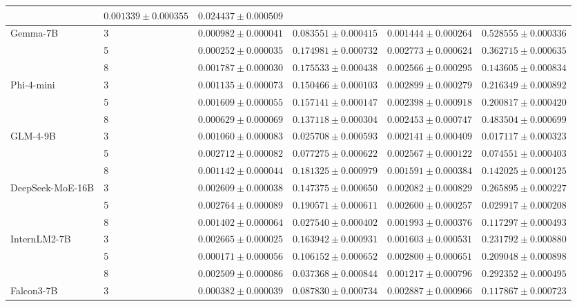 \begin{table}[!htbp]
\begin{tabular}{p{1.5cm} p{0.75cm} p{2.00cm} p{2.00cm} p{2.00cm} p{2.00cm}}
& $0.001339 \pm 0.000355$
& $0.024437 \pm 0.000509$ \\
\midrule
Gemma-7B
& 3
& $0.000982 \pm 0.000041$
& $0.083551 \pm 0.000415$
& $0.001444 \pm 0.000264$
& $0.528555 \pm 0.000336$ \\
& 5
& $0.000252 \pm 0.000035$
& $0.174981 \pm 0.000732$
& $0.002773 \pm 0.000624$
& $0.362715 \pm 0.000635$ \\
& 8
& $0.001787 \pm 0.000030$
& $0.175533 \pm 0.000438$
& $0.002566 \pm 0.000295$
& $0.143605 \pm 0.000834$ \\
\midrule
Phi-4-mini
& 3
& $0.001135 \pm 0.000073$
& $0.150466 \pm 0.000103$
& $0.002899 \pm 0.000279$
& $0.216349 \pm 0.000892$ \\
& 5
& $0.001609 \pm 0.000055$
& $0.157141 \pm 0.000147$
& $0.002398 \pm 0.000918$
& $0.200817 \pm 0.000420$ \\
& 8
& $0.000629 \pm 0.000069$
& $0.137118 \pm 0.000304$
& $0.002453 \pm 0.000747$
& $0.483504 \pm 0.000699$ \\
\midrule
GLM-4-9B
& 3
& $0.001060 \pm 0.000083$
& $0.025708 \pm 0.000593$
& $0.002141 \pm 0.000409$
& $0.017117 \pm 0.000323$ \\
& 5
& $0.002712 \pm 0.000082$
& $0.077275 \pm 0.000622$
& $0.002567 \pm 0.000122$
& $0.074551 \pm 0.000403$ \\
& 8
& $0.001142 \pm 0.000044$
& $0.181325 \pm 0.000979$
& $0.001591 \pm 0.000384$
& $0.142025 \pm 0.000125$ \\
\midrule
DeepSeek-MoE-16B
& 3
& $0.002609 \pm 0.000038$
& $0.147375 \pm 0.000650$
& $0.002082 \pm 0.000829$
& $0.265895 \pm 0.000227$ \\
& 5
& $0.002764 \pm 0.000089$
& $0.190571 \pm 0.000611$
& $0.002600 \pm 0.000257$
& $0.029917 \pm 0.000208$ \\
& 8
& $0.001402 \pm 0.000064$
& $0.027540 \pm 0.000402$
& $0.001993 \pm 0.000376$
& $0.117297 \pm 0.000493$ \\
\midrule
InternLM2-7B
& 3
& $0.002665 \pm 0.000025$
& $0.163942 \pm 0.000931$
& $0.001603 \pm 0.000531$
& $0.231792 \pm 0.000880$ \\
& 5
& $0.000171 \pm 0.000056$
& $0.106152 \pm 0.000652$
& $0.002800 \pm 0.000651$
& $0.209048 \pm 0.000898$ \\
& 8
& $0.002509 \pm 0.000086$
& $0.037368 \pm 0.000844$
& $0.001217 \pm 0.000796$
& $0.292352 \pm 0.000495$ \\
\midrule
Falcon3-7B
& 3
& $0.000382 \pm 0.000039$
& $0.087830 \pm 0.000734$
& $0.002887 \pm 0.000966$
& $0.117867 \pm 0.000723$ \\

\end{tabular}
\end{table}
